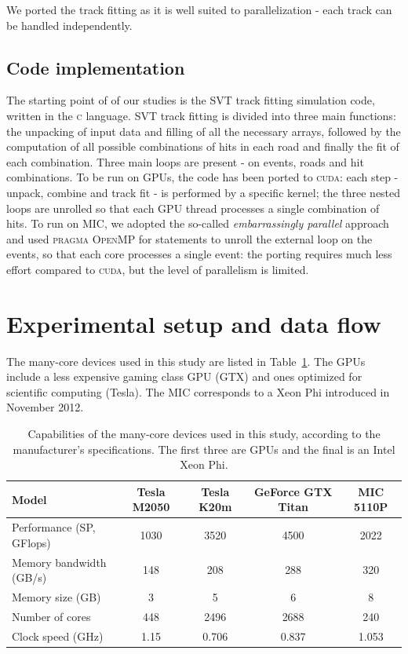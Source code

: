 \documentclass[a4]{jpconf}
\begin{document}
We ported the track fitting as it is well suited to parallelization -
each track can be handled independently.

\subsection{Code implementation}
The starting point of of our studies is the SVT track fitting
simulation code, written in the \textsc{c} language. SVT track fitting
is divided into three main functions: the unpacking of input data and
filling of all the necessary arrays, followed by the computation of
all possible combinations of hits in each road and finally the fit of
each combination. Three main loops are present - on events, roads and
hit combinations.  To be run on GPUs, the code has been ported to
\textsc{cuda}: each step - unpack, combine and track fit - is
performed by a specific kernel; the three nested loops are unrolled so
that each GPU thread processes a single combination of hits.  To run
on MIC, we adopted the so-called \textit{embarrassingly parallel}
approach and used \textsc{pragma OpenMP} for statements to unroll the external
loop on the events, so that each core processes a single event: the
porting requires much less effort compared to \textsc{cuda}, but the level of
parallelism is limited.

\section{Experimental setup and data flow}
The many-core devices used in this study are listed in
Table~\ref{tab_hwspecs}. The GPUs include a less expensive gaming
class GPU (GTX) and ones optimized for scientific computing
(Tesla). The MIC corresponds to a Xeon Phi introduced in November 2012.

\begin{table}[!t]
  \centering
  \begin{tabular}{|l|c|c|c|c|}
    \hline
    Model & Tesla M2050 & Tesla K20m & GeForce GTX  Titan & MIC 5110P \\
    \hline
    \hline
    Performance (SP, GFlops) & 1030 & 3520 & 4500 & 2022 \\
    Memory bandwidth  (GB/s) & 148 & 208 & 288  & 320\\   
    Memory size (GB) & 3 & 5 & 6 & 8 \\
    Number of cores & 448 & 2496 & 2688 & 240 \\
    Clock speed (GHz) & 1.15 & 0.706 & 0.837 & 1.053 \\
    \hline
  \end{tabular}
  \caption{Capabilities of the many-core devices used in this study,
    according to the manufacturer's specifications. The first three
    are GPUs and the final is an Intel Xeon Phi.}
  \label{tab_hwspecs}
\end{table}
\end{document}
